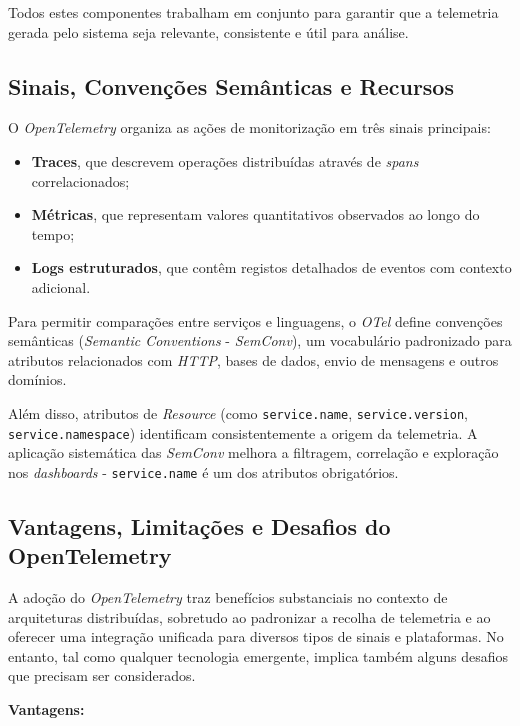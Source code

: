 Todos estes componentes trabalham em conjunto para garantir que a telemetria gerada pelo sistema seja relevante, consistente e útil para análise.

\subsection{Sinais, Convenções Semânticas e Recursos}

O \textit{OpenTelemetry} organiza as ações de monitorização em três sinais principais:

\begin{itemize}
    \item \textbf{Traces}, que descrevem operações distribuídas através de \textit{spans} correlacionados;
    \item \textbf{Métricas}, que representam valores quantitativos observados ao longo do tempo;
    \item \textbf{Logs estruturados}, que contêm registos detalhados de eventos com contexto adicional.
\end{itemize}

Para permitir comparações entre serviços e linguagens, o \textit{OTel} define convenções semânticas (\textit{Semantic Conventions} - \textit{SemConv}), um vocabulário padronizado para atributos relacionados com \textit{HTTP}, bases de dados, envio de mensagens e outros domínios. 

Além disso, atributos de \textit{Resource} (como \texttt{service.name}, \texttt{service.version}, \texttt{service.namespace}) identificam consistentemente a origem da telemetria. A aplicação sistemática das \textit{SemConv} melhora a filtragem, correlação e exploração nos \textit{dashboards} - \texttt{service.name} é um dos atributos obrigatórios.


\subsection{Vantagens, Limitações e Desafios do OpenTelemetry}

A adoção do \textit{OpenTelemetry} traz benefícios substanciais no contexto de arquiteturas distribuídas, sobretudo ao padronizar a recolha de telemetria e ao oferecer uma integração unificada para diversos tipos de sinais e plataformas. No entanto, tal como qualquer tecnologia emergente, implica também alguns desafios que precisam ser considerados.

\textbf{Vantagens:}

